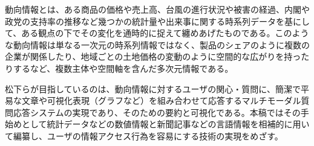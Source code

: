\documentclass{matsushita-zemi}
\begin{document}
動向情報とは、ある商品の価格や売上高、台風の進行状況や被害の経過、内閣や政党の支持率の推移など幾つかの統計量や出来事に関する時系列データを基にして、ある観点の下でその変化を通時的に捉えて纏めあげたものである。このような動向情報は単なる一次元の時系列情報ではなく、製品のシェアのように複数の企業が関係したり、地域ごとの土地価格の変動のように空間的な広がりを持ったりするなど、複数主体や空間軸を含んだ多次元情報である。

松下らが目指しているのは、動向情報に対するユーザの関心・質問に、簡潔で平易な文章や可視化表現（グラフなど）を組み合わせて応答するマルチモーダル質問応答システムの実現であり、そのための要約と可視化である。本稿ではその手始めとして統計データなどの数値情報と新聞記事などの言語情報を相補的に用いて編纂し、ユーザの情報アクセス行為を容易にする技術の実現をめざす。



\end{document}
